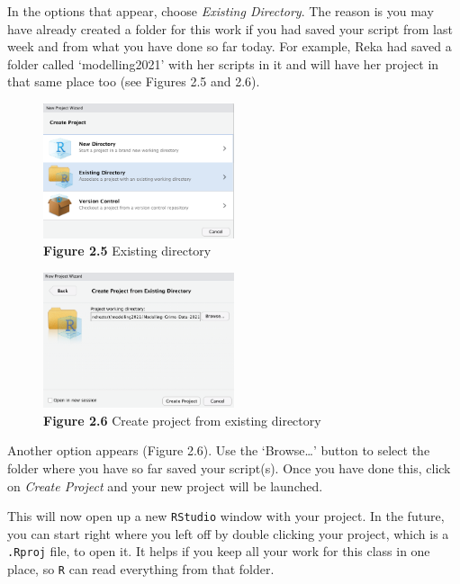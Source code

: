 \documentclass[
]{book}
\begin{document}
In the options that appear, choose \emph{Existing Directory}. The reason is you may have already created a folder for this work if you had saved your script from last week and from what you have done so far today. For example, Reka had saved a folder called `modelling2021' with her scripts in it and will have her project in that same place too (see Figures 2.5 and 2.6).

\begin{figure}
\centering
\includegraphics[width=0.5\textwidth,height=\textheight]{Images/existing_dir.png}
\caption{\textbf{Figure 2.5} Existing directory}
\end{figure}

\begin{figure}
\centering
\includegraphics[width=0.5\textwidth,height=\textheight]{Images/browse_proj_dir.png}
\caption{\textbf{Figure 2.6} Create project from existing directory}
\end{figure}

Another option appears (Figure 2.6). Use the `Browse\ldots{}' button to select the folder where you have so far saved your script(s). Once you have done this, click on \emph{Create Project} and your new project will be launched.

This will now open up a new \texttt{RStudio} window with your project. In the future, you can start right where you left off by double clicking your project, which is a \texttt{.Rproj} file, to open it. It helps if you keep all your work for this class in one place, so \texttt{R} can read everything from that folder.
\end{document}
